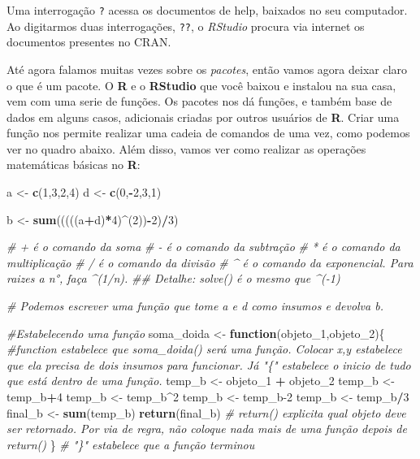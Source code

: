 \documentclass[
]{article}
\newenvironment{Shaded}{\begin{snugshade}}{\end{snugshade}}
\newcommand{\CommentTok}[1]{\textcolor[rgb]{0.56,0.35,0.01}{\textit{#1}}}
\newcommand{\ControlFlowTok}[1]{\textcolor[rgb]{0.13,0.29,0.53}{\textbf{#1}}}
\newcommand{\DecValTok}[1]{\textcolor[rgb]{0.00,0.00,0.81}{#1}}
\newcommand{\KeywordTok}[1]{\textcolor[rgb]{0.13,0.29,0.53}{\textbf{#1}}}
\newcommand{\NormalTok}[1]{#1}
\newcommand{\OperatorTok}[1]{\textcolor[rgb]{0.81,0.36,0.00}{\textbf{#1}}}
\newcommand{\StringTok}[1]{\textcolor[rgb]{0.31,0.60,0.02}{#1}}
\begin{document}
Uma interrogação \texttt{?} acessa os documentos de help, baixados no
seu computador. Ao digitarmos duas interrogações, \texttt{??}, o
\emph{RStudio} procura via internet os documentos presentes no CRAN.

Até agora falamos muitas vezes sobre os \emph{pacotes}, então vamos
agora deixar claro o que é um pacote. O \textbf{R} e o \textbf{RStudio}
que você baixou e instalou na sua casa, vem com uma serie de funções. Os
pacotes nos dá funções, e também base de dados em alguns casos,
adicionais criadas por outros usuários de \textbf{R}. Criar uma função
nos permite realizar uma cadeia de comandos de uma vez, como podemos ver
no quadro abaixo. Além disso, vamos ver como realizar as operações
matemáticas básicas no \textbf{R}:

\begin{Shaded}
\begin{Highlighting}[]
\NormalTok{a <-}\StringTok{ }\KeywordTok{c}\NormalTok{(}\DecValTok{1}\NormalTok{,}\DecValTok{3}\NormalTok{,}\DecValTok{2}\NormalTok{,}\DecValTok{4}\NormalTok{)}
\NormalTok{d <-}\StringTok{ }\KeywordTok{c}\NormalTok{(}\DecValTok{0}\NormalTok{,}\OperatorTok{-}\DecValTok{2}\NormalTok{,}\DecValTok{3}\NormalTok{,}\DecValTok{1}\NormalTok{)}

\NormalTok{b <-}\StringTok{ }\KeywordTok{sum}\NormalTok{(((((a}\OperatorTok{+}\NormalTok{d)}\OperatorTok{*}\DecValTok{4}\NormalTok{)}\OperatorTok{^}\NormalTok{(}\DecValTok{2}\NormalTok{))}\OperatorTok{-}\DecValTok{2}\NormalTok{)}\OperatorTok{/}\DecValTok{3}\NormalTok{)}

\CommentTok{# + é o comando da soma }
\CommentTok{# - é o comando da subtração }
\CommentTok{# * é o comando da multiplicação}
\CommentTok{# / é o comando da divisão}
\CommentTok{# ^ é o comando da exponencial. Para raizes a n°, faça ^(1/n).}
\CommentTok{## Detalhe: solve() é o mesmo que ^(-1)}

\CommentTok{# Podemos escrever uma função que tome a e d como insumos e devolva b.}

\CommentTok{#Estabelecendo uma função}
\NormalTok{soma_doida <-}\StringTok{ }\ControlFlowTok{function}\NormalTok{(objeto_}\DecValTok{1}\NormalTok{,objeto_}\DecValTok{2}\NormalTok{)\{ }\CommentTok{#function estabelece que soma_doida() será uma função. Colocar x,y estabelece que ela precisa de dois insumos para funcionar. Já "\{" estabelece o inicio de tudo que está dentro de uma função.}
\NormalTok{ temp_b <-}\StringTok{ }\NormalTok{objeto_}\DecValTok{1} \OperatorTok{+}\StringTok{ }\NormalTok{objeto_}\DecValTok{2}
\NormalTok{ temp_b <-}\StringTok{ }\NormalTok{temp_b}\OperatorTok{+}\DecValTok{4}
\NormalTok{ temp_b <-}\StringTok{ }\NormalTok{temp_b}\OperatorTok{^}\DecValTok{2}
\NormalTok{ temp_b <-}\StringTok{ }\NormalTok{temp_b}\DecValTok{-2}
\NormalTok{ temp_b <-}\StringTok{ }\NormalTok{temp_b}\OperatorTok{/}\DecValTok{3}
\NormalTok{ final_b <-}\StringTok{ }\KeywordTok{sum}\NormalTok{(temp_b)}
 \KeywordTok{return}\NormalTok{(final_b) }\CommentTok{# return() explicita qual objeto deve ser retornado. Por via de regra, não coloque nada mais de uma função depois de return()}
\NormalTok{   \} }\CommentTok{# "\}" estabelece que a função terminou }


\end{Highlighting}
\end{Shaded}
\end{document}
